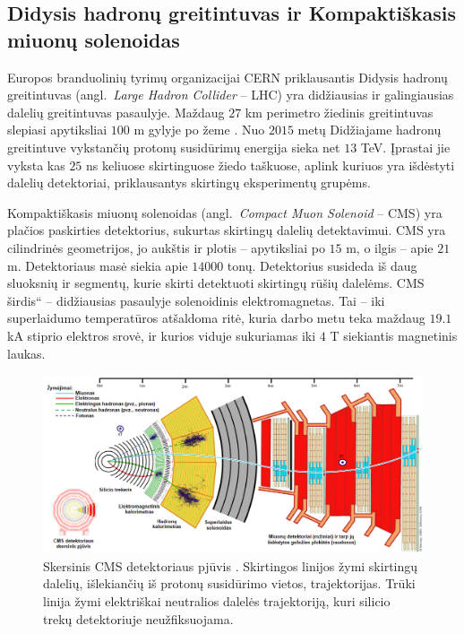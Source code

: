 \documentclass[a4paper, 12pt, twoside]{article}
\newcommand{\ltq}[1]{{\quotedblbase{}#1\textquotedblleft{}}}
\newlength\q
\begin{document}
\subsection{Didysis hadronų greitintuvas ir Kompaktiškasis miuonų solenoidas}

Europos branduolinių tyrimų organizacijai CERN priklausantis Didysis hadronų greitintuvas
(angl.\ \textit{Large Hadron Collider} -- LHC) yra didžiausias ir galingiausias dalelių greitintuvas pasaulyje.
Maždaug $27$ km perimetro žiedinis greitintuvas slepiasi apytiksliai $100$ m gylyje po žeme \cite{LHC}.
Nuo $2015$ metų Didžiajame hadronų greitintuve vykstančių protonų susidūrimų energija sieka net $13$ TeV.
Įprastai jie vyksta kas $25$ ns keliuose skirtinguose žiedo taškuose, aplink kuriuos yra išdėstyti dalelių
detektoriai, priklausantys skirtingų eksperimentų grupėms.

Kompaktiškasis miuonų solenoidas (angl.\ \textit{Compact Muon Solenoid} -- CMS) yra plačios paskirties
detektorius, sukurtas skirtingų dalelių detektavimui.
CMS yra cilindrinės geometrijos, jo aukštis ir plotis -- apytiksliai po $15$ m, o ilgis --
apie $21$ m.
Detektoriaus masė siekia apie $14000$ tonų.
Detektorius susideda iš daug sluoksnių ir segmentų, kurie skirti detektuoti skirtingų rūšių dalelėms.
CMS \ltq{širdis} -- didžiausias pasaulyje solenoidinis elektromagnetas.
Tai -- iki superlaidumo temperatūros atšaldoma ritė, kuria darbo metu teka maždaug $19.1$ kA stiprio
elektros srovė, ir kurios viduje sukuriamas iki $4$ T siekiantis magnetinis laukas.

\vspace{0.2cm}
\begin{figure}[H]
	\includegraphics[width=\textwidth]{CMSslice_LT.png}
	\caption{\label{fig:CMSslice}Skersinis CMS detektoriaus pjūvis \cite{CMSslice}.
	Skirtingos linijos žymi skirtingų dalelių, išlekiančių iš protonų susidūrimo vietos, trajektorijas.
	Trūki linija žymi elektriškai neutralios dalelės trajektoriją, kuri silicio trekų detektoriuje
	neužfiksuojama.}
\end{figure}
\end{document}
